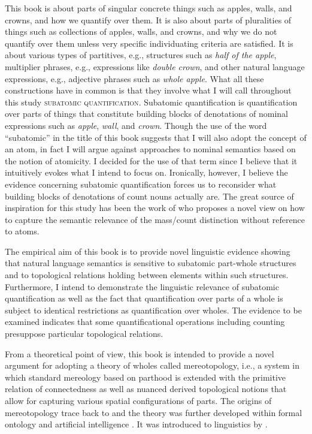 This book is about parts of singular concrete things such as apples, walls, and crowns, and how we quantify over them. It is also about parts of pluralities of things such as collections of apples, walls, and crowns, and why we do not quantify over them unless very specific individuating criteria are satisfied. It is about various types of partitives, e.g., structures such as \textit{half of the apple}, multiplier phrases, e.g., expressions like \textit{double crown}, and other natural language expressions, e.g., adjective phrases such as \textit{whole apple}. What all these constructions have in common is that they involve what I will call throughout this study \textsc{subatomic quantification}. Subatomic quantification is quantification over parts of things that constitute building blocks of denotations of nominal expressions such as \textit{apple}, \textit{wall}, and \textit{crown}. Though the use of the word ``subatomic'' in the title of this book suggests that I will also adopt the concept of an atom, in fact I will argue against approaches to nominal semantics based on the notion of atomicity. I decided for the use of that term since I believe that it intuitively evokes what I intend to focus on. Ironically, however, I believe the evidence concerning subatomic quantification forces us to reconsider what building blocks of denotations of count nouns actually are. The great source of inspiration for this study has been the work of \citet{grimm2012degrees,grimm2012number} who proposes a novel view on how to capture the semantic relevance of the mass/count distinction without reference to atoms. 

The empirical aim of this book is to provide novel linguistic evidence showing that natural language semantics is sensitive to subatomic part-whole structures and to topological relations holding between elements within such structures. Furthermore, I intend to demonstrate the linguistic relevance of subatomic quantification as well as the fact that quantification over parts of a whole is subject to identical restrictions as quantification over wholes. The evidence to be examined indicates that some quantificational operations including counting presuppose particular topological relations.

From a theoretical point of view, this book is intended to provide a novel argument for adopting a theory of wholes called mereotopology, i.e., a system in which standard mereology based on parthood is extended with the primitive relation of connectedness as well as nuanced derived topological notions that allow for capturing various spatial configurations of parts. The origins of mereotopology trace back to \citet{whitehead1920concept,whitehead1929process} and the theory was further developed within formal ontology and artificial intelligence \citep[e.g.,][]{clarke1981calculus,smith1996mereotopology,roeper1997region,casati_varzi1999parts,varzi2007spatial}. It was introduced to linguistics by \citet{grimm2012degrees,grimm2012number}.

